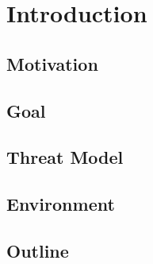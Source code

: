 
\chapter{Introduction}\label{chapter:introduction}

\section{Motivation}
\section{Goal}
\section{Threat Model}
\section{Environment}
\section{Outline}
